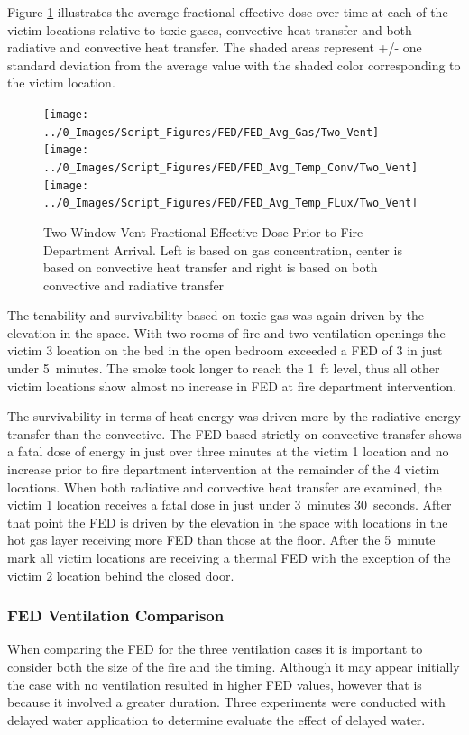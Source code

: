 \documentclass[12pt,oneside]{book}
\begin{document}
Figure \ref{fig:FED_TwoVent} illustrates the average fractional effective dose over time at each of the victim locations relative to toxic gases, convective heat transfer and both radiative and convective heat transfer. The shaded areas represent +/- one standard deviation from the average value with the shaded color corresponding to the victim location. 

\begin{figure}[H]
	\centering
	\texttt{[image: ../0\_Images/Script\_Figures/FED/FED\_Avg\_Gas/Two\_Vent]}
	\texttt{[image: ../0\_Images/Script\_Figures/FED/FED\_Avg\_Temp\_Conv/Two\_Vent]} 
	\texttt{[image: ../0\_Images/Script\_Figures/FED/FED\_Avg\_Temp\_FLux/Two\_Vent]}
	\caption[Two Window Vent Fractional Effective Dose]{Two Window Vent Fractional Effective Dose Prior to Fire Department Arrival. Left is based on gas concentration, center is based on convective heat transfer and right is based on both convective and radiative transfer}
	\label{fig:FED_TwoVent}
\end{figure}

The tenability and survivability based on toxic gas was again driven by the elevation in the space. With two rooms of fire and two ventilation openings the victim 3 location on the bed in the open bedroom exceeded a FED of 3 in just under 5~minutes. The smoke took longer to reach the 1~ft level, thus all other victim locations show almost no increase in FED at fire department intervention.

The survivability in terms of heat energy was driven more by the radiative energy transfer than the convective. The FED based strictly on convective transfer shows a fatal dose of energy in just over three minutes at the victim 1 location and no increase prior to fire department intervention at the remainder of the 4 victim locations. When both radiative and convective heat transfer are examined, the victim 1 location receives a fatal dose in just under 3~minutes 30~seconds. After that point the FED is driven by the elevation in the space with locations in the hot gas layer receiving more FED than those at the floor. After the 5~minute mark all victim locations are receiving a thermal FED with the exception of the victim 2 location behind the closed door.  

\subsubsection{FED Ventilation Comparison}
When comparing the FED for the three ventilation cases it is important to consider both the size of the fire and the timing. Although it may appear initially the case with no ventilation resulted in higher FED values, however that is because it involved a greater duration. Three experiments were conducted with delayed water application to determine evaluate the effect of delayed water. 
\end{document}
